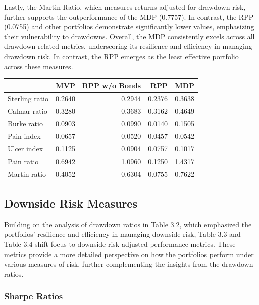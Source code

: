 \documentclass[11pt,preprint]{elsarticle}
\let\origtable\table
\let\endorigtable\endtable
\renewenvironment{table}[1][2] {
    \expandafter\origtable\expandafter[H]
} {
    \endorigtable
}
\numberwithin{equation}{section}
\numberwithin{figure}{section}
\numberwithin{table}{section}
\begin{document}
Lastly, the Martin Ratio, which measures returns adjusted for drawdown
risk, further supports the outperformance of the MDP (0.7757). In
contrast, the RPP (0.0755) and other portfolios demonstrate
significantly lower values, emphasizing their vulnerability to
drawdowns. Overall, the MDP consistently excels across all
drawdown-related metrics, underscoring its resilience and efficiency in
managing drawdown risk. In contrast, the RPP emerges as the least
effective portfolio across these measures.

\begin{table}
\centering
\caption{\label{tab:drawdowns-ratio}Drawdowns ratio table}
\centering
\begin{tabular}[t]{l|r|r|r|r}
\hline
  & MVP & RPP w/o Bonds & RPP & MDP\\
\hline
Sterling ratio & 0.2640 & 0.2944 & 0.2376 & 0.3638\\
\hline
Calmar ratio & 0.3280 & 0.3683 & 0.3162 & 0.4649\\
\hline
Burke ratio & 0.0903 & 0.0990 & 0.0140 & 0.1505\\
\hline
Pain index & 0.0657 & 0.0520 & 0.0457 & 0.0542\\
\hline
Ulcer index & 0.1125 & 0.0904 & 0.0757 & 0.1017\\
\hline
Pain ratio & 0.6942 & 1.0960 & 0.1250 & 1.4317\\
\hline
Martin ratio & 0.4052 & 0.6304 & 0.0755 & 0.7622\\
\hline
\end{tabular}
\end{table}

\subsection{Downside Risk Measures}\label{downside-risk-measures}

Building on the analysis of drawdown ratios in Table 3.2, which
emphasized the portfolios' resilience and efficiency in managing
downside risk, Table 3.3 and Table 3.4 shift focus to downside
risk-adjusted performance metrics. These metrics provide a more detailed
perspective on how the portfolios perform under various measures of
risk, further complementing the insights from the drawdown ratios.

\subsubsection{Sharpe Ratios}\label{sharpe-ratios}
\end{document}
